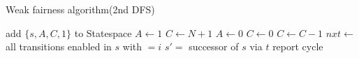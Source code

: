 \documentclass[12pt]{beamer}
\begin{document}
\begin{frame}[allowframebreaks]{Weak fairness algorithm(2nd DFS)}

\begin{algorithmic}
	\State add $\{s,A,C,1\}$ to Statespace
	 
			\State $A \gets 1$
			\State $C \gets N+1$
		\EndIf
	\Else
		 
			\State $A \gets 0$
			\State $C \gets 0$
		\EndIf
	\EndIf
		 
			\State $C \gets C - 1$
		\EndIf
		\State $nxt \gets$ all transitions enabled in $s$ with  $= i$
			\State $s' =$ successor of $s$ via $t$
			 
				\State report cycle
			\EndIf
		\EndFor
	\EndFor
\EndProcedure
\end{algorithmic}
\end{frame}
\end{document}
